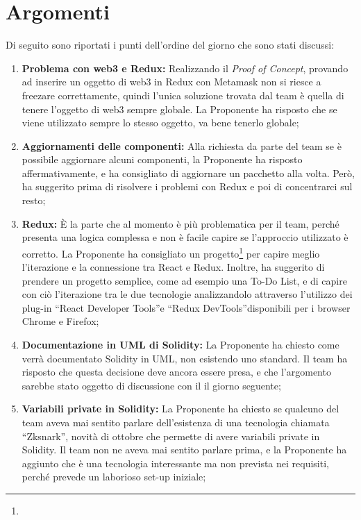\documentclass[VER-2018-01-09.tex]{subfiles}
\begin{document}
\section{Argomenti}
Di seguito sono riportati i punti dell'ordine del giorno che sono stati discussi:
\begin{enumerate}
	\item \textbf{Problema con web3 e Redux:} Realizzando il \textit{Proof of Concept}, provando ad inserire un oggetto di web3 in Redux con Metamask non si riesce a freezare correttamente, quindi l'unica soluzione trovata dal team è quella di tenere l'oggetto di web3 sempre globale. La Proponente ha risposto che se viene utilizzato sempre lo stesso oggetto, va bene tenerlo globale;
	\item \textbf{Aggiornamenti delle componenti:} Alla richiesta da parte del team se è possibile aggiornare alcuni componenti, la Proponente ha risposto affermativamente, e ha consigliato di aggiornare un pacchetto alla volta. Però, ha suggerito prima di risolvere i problemi con Redux e poi di concentrarci sul resto;
	\item \textbf{Redux:} \`{E} la parte che al momento è più problematica per il team, perché presenta una logica complessa e non è facile capire se l'approccio utilizzato è corretto. La Proponente ha consigliato un progetto\footnote{} per capire meglio l'iterazione e la connessione tra React e Redux. Inoltre, ha suggerito di prendere un progetto semplice, come ad esempio una To-Do List, e di capire con ciò l'iterazione tra le due tecnologie analizzandolo attraverso l'utilizzo dei plug-in \textquotedblleft React Developer Tools\textquotedblright e \textquotedblleft Redux DevTools\textquotedblright disponibili per i browser Chrome e Firefox;
	\item \textbf{Documentazione in UML di Solidity:} La Proponente ha chiesto come verrà documentato Solidity in UML, non esistendo uno standard. Il team ha risposto che questa decisione deve ancora essere presa, e che l'argomento sarebbe stato oggetto di discussione con il \Vardanega il giorno seguente;
	\item \textbf{Variabili private in Solidity:} La Proponente ha chiesto se qualcuno del team aveva mai sentito parlare dell'esistenza di una tecnologia chiamata \textquotedblleft Zksnark\textquotedblright, novità di ottobre che permette di avere variabili private in Solidity. Il team non ne aveva mai sentito parlare prima, e la Proponente ha aggiunto che è una tecnologia interessante ma non prevista nei requisiti, perché prevede un laborioso set-up iniziale;

\end{enumerate}
\end{document}
